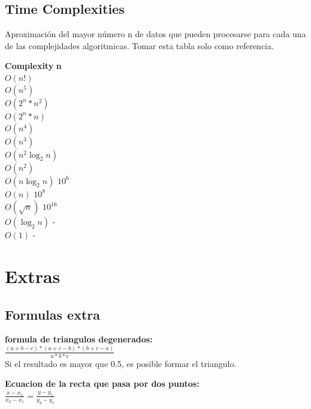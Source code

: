 \documentclass[10pt,landscape,twocolumn,a4paper,notitlepage]{article}
\begin{document}
\subsection{Time Complexities}

Aproximación del mayor número n de datos que pueden procesarse para cada una de las complejidades algoritmicas. Tomar esta tabla solo como referencia.

\begin{tabbing}
\textbf{Complexity}\hspace{4cm} \=  \textbf{n}\hspace{3cm}   \\ 
$O(n!)$ \\ 
$O(n^{5})$ \\ 
$O(2^{n}*n^{2})$ \\ 
$O(2^{n}*n)$ \\ 
$O(n^{4})$ \\ 
$O(n^{3})$ \\ 
$O(n^{2}\log_{2}n)$ \\ 
$O(n^{2})$ \\ 
$O(n\log_{2}n)$ \> $10^{6}$\\ 
$O(n)$ \> $10^{8}$\\ 
$O(\sqrt{n})$ \> $10^{16}$\\ 
$O(\log_{2}n)$ \> -\\ 
$O(1)$ \> -\\ 
\end{tabbing}

	\section{Extras}
		\subsection{Formulas extra}
			\textbf{formula de triangulos degenerados:}\\
			\vspace{3mm}
			{\Large$\frac{(a + b - c) * (a + c - b) * (b  + c - a)} {a * b * c}$}
			\vspace{3mm}
			\\Si el resultado es mayor que 0.5, es posible formar el triangulo.
	
			\vspace{8mm}
			\textbf{Ecuacion de la recta que pasa por dos puntos:}\\
			\vspace{3mm}
			{\Large $\frac{x - x_{1}}{x_{2} - x_{1}} = \frac{y - y_{1}}{y_{2} - y_{1}}$}
\end{document}
